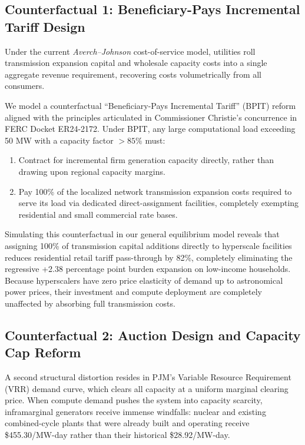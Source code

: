 \documentclass[11pt,a4paper]{article}
\begin{document}
\subsection{Counterfactual 1: Beneficiary-Pays Incremental Tariff Design}

Under the current \emph{Averch--Johnson} cost-of-service model, utilities roll transmission expansion capital and wholesale capacity costs into a single aggregate revenue requirement, recovering costs volumetrically from all consumers. 

We model a counterfactual ``Beneficiary-Pays Incremental Tariff'' (BPIT) reform aligned with the principles articulated in Commissioner Christie's concurrence in FERC Docket ER24-2172. Under BPIT, any large computational load exceeding 50 MW with a capacity factor $>85\%$ must:
\begin{enumerate}
    \item Contract for incremental firm generation capacity directly, rather than drawing upon regional capacity margins.
    \item Pay 100\% of the localized network transmission expansion costs required to serve its load via dedicated direct-assignment facilities, completely exempting residential and small commercial rate bases.
\end{enumerate}

Simulating this counterfactual in our general equilibrium model reveals that assigning 100\% of transmission capital additions directly to hyperscale facilities reduces residential retail tariff pass-through by 82\%, completely eliminating the regressive +2.38 percentage point burden expansion on low-income households. Because hyperscalers have zero price elasticity of demand up to astronomical power prices, their investment and compute deployment are completely unaffected by absorbing full transmission costs.

\subsection{Counterfactual 2: Auction Design and Capacity Cap Reform}

A second structural distortion resides in PJM's Variable Resource Requirement (VRR) demand curve, which clears all capacity at a uniform marginal clearing price. When compute demand pushes the system into capacity scarcity, inframarginal generators receive immense windfalls: nuclear and existing combined-cycle plants that were already built and operating receive \$455.30/MW-day rather than their historical \$28.92/MW-day.
\end{document}
